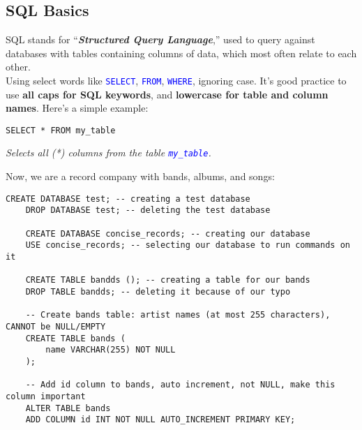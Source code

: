 \subsection{SQL Basics}





SQL stands for ``\textbf{\textit{Structured Query Language}},'' used to query against databases with tables
containing columns of data, which most often relate to each other.\\

\noindent
Using select words like \textcolor{blue}{\texttt{SELECT}}, \textcolor{blue}{\texttt{FROM}}, \textcolor{blue}{\texttt{WHERE}},
ignoring case. It's good practice to use \textbf{all caps for SQL keywords}, and \textbf{lowercase for table and column names}.
Here's a simple example:\\

\begin{lstlisting}[style=sql]
    SELECT * FROM my_table
\end{lstlisting}
\begin{centering}
    \textit{Selects all (*) columns from the table \textcolor{blue}{\texttt{my\_table}}.}\\
\end{centering}

\vspace{1em}
\noindent
Now, we are a record company with bands, albums, and songs:\\


\begin{lstlisting}[style=sql]
    CREATE DATABASE test; -- creating a test database
    DROP DATABASE test; -- deleting the test database

    CREATE DATABASE concise_records; -- creating our database 
    USE concise_records; -- selecting our database to run commands on it

    CREATE TABLE bandds (); -- creating a table for our bands
    DROP TABLE bandds; -- deleting it because of our typo
    
    -- Create bands table: artist names (at most 255 characters), CANNOT be NULL/EMPTY
    CREATE TABLE bands (
        name VARCHAR(255) NOT NULL
    );

    -- Add id column to bands, auto increment, not NULL, make this column important
    ALTER TABLE bands 
    ADD COLUMN id INT NOT NULL AUTO_INCREMENT PRIMARY KEY;
\end{lstlisting}

